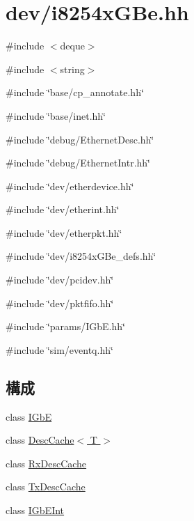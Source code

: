 \hypertarget{i8254xGBe_8hh}{
\section{dev/i8254xGBe.hh}
\label{i8254xGBe_8hh}
}
{\ttfamily \#include $<$deque$>$}\par
{\ttfamily \#include $<$string$>$}\par
{\ttfamily \#include \char`\"{}base/cp\_\-annotate.hh\char`\"{}}\par
{\ttfamily \#include \char`\"{}base/inet.hh\char`\"{}}\par
{\ttfamily \#include \char`\"{}debug/EthernetDesc.hh\char`\"{}}\par
{\ttfamily \#include \char`\"{}debug/EthernetIntr.hh\char`\"{}}\par
{\ttfamily \#include \char`\"{}dev/etherdevice.hh\char`\"{}}\par
{\ttfamily \#include \char`\"{}dev/etherint.hh\char`\"{}}\par
{\ttfamily \#include \char`\"{}dev/etherpkt.hh\char`\"{}}\par
{\ttfamily \#include \char`\"{}dev/i8254xGBe\_\-defs.hh\char`\"{}}\par
{\ttfamily \#include \char`\"{}dev/pcidev.hh\char`\"{}}\par
{\ttfamily \#include \char`\"{}dev/pktfifo.hh\char`\"{}}\par
{\ttfamily \#include \char`\"{}params/IGbE.hh\char`\"{}}\par
{\ttfamily \#include \char`\"{}sim/eventq.hh\char`\"{}}\par
\subsection*{構成}
\begin{DoxyCompactItemize}
\item 
class \hyperlink{classIGbE}{IGbE}
\item 
class \hyperlink{classIGbE_1_1DescCache}{DescCache$<$ T $>$}
\item 
class \hyperlink{classIGbE_1_1RxDescCache}{RxDescCache}
\item 
class \hyperlink{classIGbE_1_1TxDescCache}{TxDescCache}
\item 
class \hyperlink{classIGbEInt}{IGbEInt}
\end{DoxyCompactItemize}
